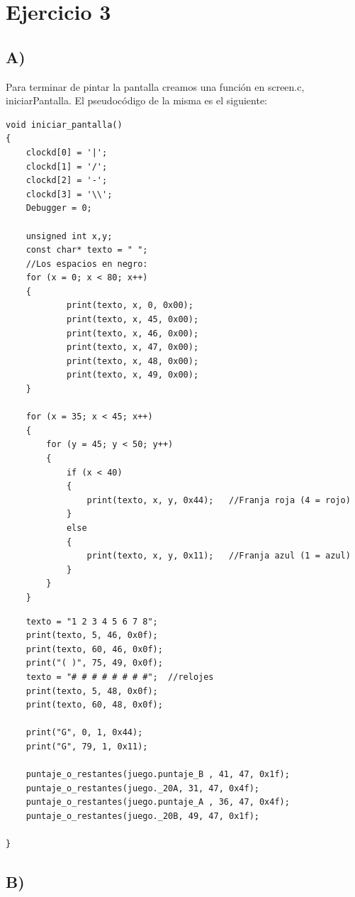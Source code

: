 \section{Ejercicio 3}
\subsection*{A)}
Para terminar de pintar la pantalla creamos una funci\'on en screen.c, iniciarPantalla. El pseudoc\'odigo de la misma es el siguiente:
\begin{codesnippet}
\begin{verbatim}
void iniciar_pantalla()
{	
	clockd[0] = '|';
	clockd[1] = '/';
	clockd[2] = '-';
	clockd[3] = '\\';
	Debugger = 0;
	
	unsigned int x,y;
	const char* texto = " ";
	//Los espacios en negro:
	for (x = 0; x < 80; x++)
	{
			print(texto, x, 0, 0x00);
			print(texto, x, 45, 0x00);
			print(texto, x, 46, 0x00);
			print(texto, x, 47, 0x00);
			print(texto, x, 48, 0x00);
			print(texto, x, 49, 0x00);	
	} 
	
	for (x = 35; x < 45; x++)
	{
		for (y = 45; y < 50; y++)
		{
			if (x < 40)
			{
				print(texto, x, y, 0x44);	//Franja roja (4 = rojo)
			}
			else
			{
				print(texto, x, y, 0x11);	//Franja azul (1 = azul)
			}
		}	
	}
\end{verbatim}
\end{codesnippet}
\begin{codesnippet}
\begin{verbatim}
	texto = "1 2 3 4 5 6 7 8";
	print(texto, 5, 46, 0x0f);
	print(texto, 60, 46, 0x0f);
	print("( )", 75, 49, 0x0f);
	texto = "# # # # # # # #";	//relojes
	print(texto, 5, 48, 0x0f);
	print(texto, 60, 48, 0x0f);

	print("G", 0, 1, 0x44);
	print("G", 79, 1, 0x11);
	
	puntaje_o_restantes(juego.puntaje_B , 41, 47, 0x1f);
	puntaje_o_restantes(juego._20A, 31, 47, 0x4f);
	puntaje_o_restantes(juego.puntaje_A , 36, 47, 0x4f);
	puntaje_o_restantes(juego._20B, 49, 47, 0x1f);
	
}
\end{verbatim}
\end{codesnippet}

\subsection*{B)}

